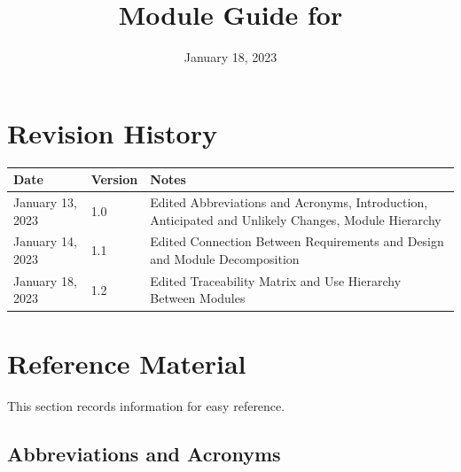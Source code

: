 \documentclass[12pt, titlepage]{article}
\begin{document}
\title{Module Guide for \progname{}} 
\author{\authname}
\date{January 18, 2023}

\maketitle


\section{Revision History}

\begin{tabularx}{\textwidth}{p{3cm}p{2cm}X}
\toprule {\bf Date} & {\bf Version} & {\bf Notes}\\
\midrule
January 13, 2023 & 1.0 & Edited Abbreviations and Acronyms, Introduction, Anticipated and Unlikely Changes, Module Hierarchy\\
January 14, 2023 & 1.1 & Edited Connection Between Requirements and Design and Module Decomposition\\
January 18, 2023 & 1.2 & Edited Traceability Matrix and Use Hierarchy Between Modules\\
\bottomrule
\end{tabularx}

\newpage

\section{Reference Material}

This section records information for easy reference.

\subsection{Abbreviations and Acronyms}
\end{document}
